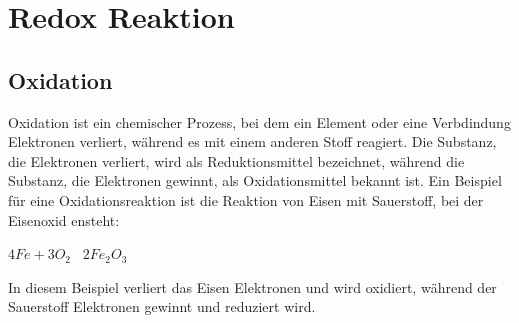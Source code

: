 
\section{Redox Reaktion}

\subsection{Oxidation} 
\label{sec:oxidation}
Oxidation ist ein chemischer Prozess, bei dem ein Element oder eine Verbdindung Elektronen verliert, während es mit einem anderen Stoff reagiert.
Die Substanz, die Elektronen verliert, wird als Reduktionsmittel bezeichnet, während die Substanz,  die Elektronen gewinnt, als Oxidationsmittel bekannt ist.
Ein Beispiel für eine Oxidationsreaktion ist die Reaktion von Eisen mit Sauerstoff, bei der Eisenoxid ensteht:

$4Fe + 3O_2$ \textrightarrow\ $2Fe_2O_3$ 

In diesem Beispiel verliert das Eisen Elektronen und wird oxidiert, während der Sauerstoff Elektronen gewinnt und reduziert wird.

